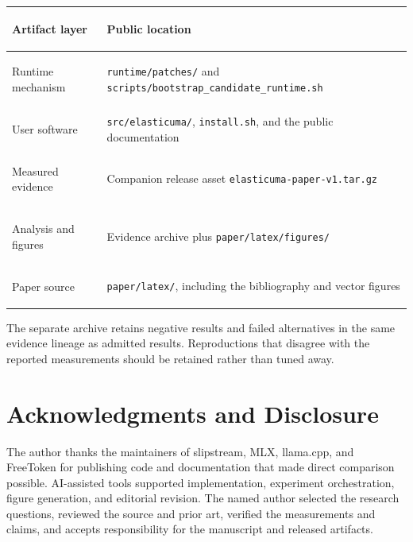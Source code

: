 \documentclass[10pt,letterpaper]{article}
\newcommand{\code}[1]{\texttt{#1}}
\begin{document}
\begin{center}
\small
\begin{tabularx}{0.96\linewidth}{>{\bfseries\raggedright\arraybackslash}p{3.25cm} >{\raggedright\arraybackslash}X}
\toprule
Artifact layer & Public location \\
\midrule
Runtime mechanism & \code{runtime/patches/} and \code{scripts/bootstrap\_candidate\_runtime.sh} \\
User software & \code{src/elasticuma/}, \code{install.sh}, and the public documentation \\
Measured evidence & Companion release asset \code{elasticuma-paper-v1.tar.gz} \\
Analysis and figures & Evidence archive plus \code{paper/latex/figures/} \\
Paper source & \code{paper/latex/}, including the bibliography and vector figures \\
\bottomrule
\end{tabularx}
\end{center}

The separate archive retains negative results and failed alternatives in the
same evidence lineage as admitted results. Reproductions that disagree with the
reported measurements should be retained rather than tuned away.

\section*{Acknowledgments and Disclosure}
The author thanks the maintainers of slipstream, MLX, llama.cpp, and FreeToken
for publishing code and documentation that made direct comparison possible.
AI-assisted tools supported implementation, experiment orchestration, figure
generation, and editorial revision. The named author selected the research
questions, reviewed the source and prior art, verified the measurements and
claims, and accepts responsibility for the manuscript and released artifacts.

\renewcommand{\bibfont}{\small\raggedright}
\setlength{\bibsep}{3pt plus 1pt minus 1pt}


\end{document}
